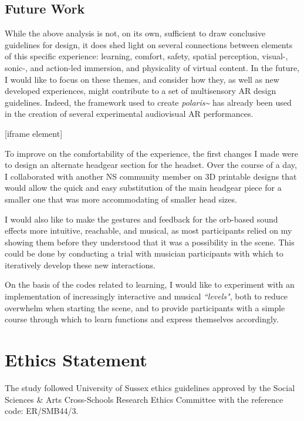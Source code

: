 \subsection{Future Work}\label{sec: polaris-conclusion-future}
While the above analysis is not, on its own, sufficient to draw conclusive guidelines for design, it does shed light on several connections between elements of this specific experience: learning, comfort, safety, spatial perception, visual-, sonic-, and action-led immersion, and physicality of virtual content. In the future, I would like to focus on these themes, and consider how they, as well as new developed experiences, might contribute to a set of multisensory AR design guidelines. Indeed, the framework used to create \textit{polaris\textasciitilde{}} has already been used in the creation of several experimental audiovisual AR performances.

[iframe element]

To improve on the comfortability of the experience, the first changes I made were to design an alternate headgear section for the headset. Over the course of a day, I collaborated with another NS community member on 3D printable designs that would allow the quick and easy substitution of the main headgear piece for a smaller one that was more accommodating of smaller head sizes.

I would also like to make the gestures and feedback for the orb-based sound effects more intuitive, reachable, and musical, as most participants relied on my showing them before they understood that it was a possibility in the scene. This could be done by conducting a trial with musician participants with which to iteratively develop these new interactions. 

On the basis of the codes related to learning, I would like to experiment with an implementation of increasingly interactive and musical \textit{``levels"}, both to reduce overwhelm when starting the scene, and to provide participants with a simple course through which to learn functions and express themselves accordingly.

\section{Ethics Statement}\label{sec: polaris-ethics}
The study followed University of Sussex ethics guidelines approved by the Social Sciences \& Arts Cross-Schools Research Ethics Committee with the reference code: ER/SMB44/3.

